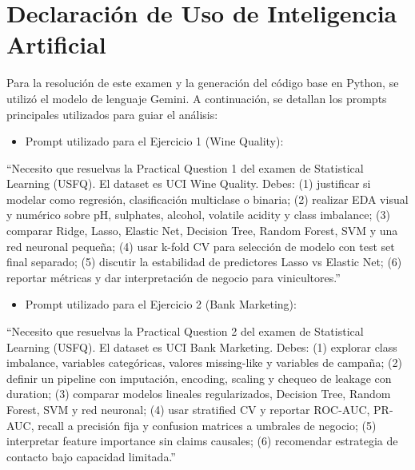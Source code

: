 \documentclass[11pt,spanish]{article}
\begin{document}
\section{Declaración de Uso de Inteligencia Artificial}

Para la resolución de este examen y la generación del código base en Python, se utilizó el modelo de lenguaje Gemini. A continuación, se detallan los prompts principales utilizados para guiar el análisis:

\begin{itemize}
    \item Prompt utilizado para el Ejercicio 1 (Wine Quality):
\end{itemize}

``Necesito que resuelvas la Practical Question 1 del examen de Statistical Learning (USFQ). El dataset es UCI Wine Quality. Debes: (1) justificar si modelar como regresión, clasificación multiclase o binaria; (2) realizar EDA visual y numérico sobre pH, sulphates, alcohol, volatile acidity y class imbalance; (3) comparar Ridge, Lasso, Elastic Net, Decision Tree, Random Forest, SVM y una red neuronal pequeña; (4) usar k-fold CV para selección de modelo con test set final separado; (5) discutir la estabilidad de predictores Lasso vs Elastic Net; (6) reportar métricas y dar interpretación de negocio para vinicultores.''

\begin{itemize}
    \item Prompt utilizado para el Ejercicio 2 (Bank Marketing):
\end{itemize}

``Necesito que resuelvas la Practical Question 2 del examen de Statistical Learning (USFQ). El dataset es UCI Bank Marketing. Debes: (1) explorar class imbalance, variables categóricas, valores missing-like y variables de campaña; (2) definir un pipeline con imputación, encoding, scaling y chequeo de leakage con duration; (3) comparar modelos lineales regularizados, Decision Tree, Random Forest, SVM y red neuronal; (4) usar stratified CV y reportar ROC-AUC, PR-AUC, recall a precisión fija y confusion matrices a umbrales de negocio; (5) interpretar feature importance sin claims causales; (6) recomendar estrategia de contacto bajo capacidad limitada.''
\end{document}
